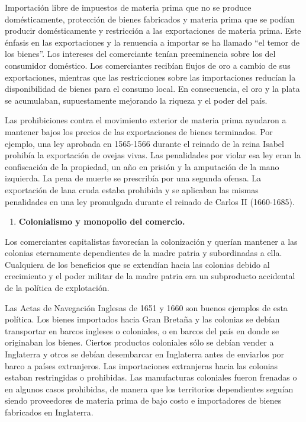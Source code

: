 \documentclass[
  stu,
  floatsintext,
  longtable,
  a4paper,
  nolmodern,
  notxfonts,
  notimes,
  12pt,
  colorlinks=true,linkcolor=blue,citecolor=blue,urlcolor=blue]{apa7}
\providecommand{\tightlist}{%
  \setlength{\itemsep}{0pt}\setlength{\parskip}{0pt}}
\begin{document}
Importación libre de impuestos de materia prima que no se produce
domésticamente, protección de bienes fabricados y materia prima que se
podían producir domésticamente y restricción a las exportaciones de
materia prima. Este énfasis en las exportaciones y la renuencia a
importar se ha llamado ``el temor de los bienes''. Los intereses del
comerciante tenían preeminencia sobre los del consumidor doméstico. Los
comerciantes recibían flujos de oro a cambio de sus exportaciones,
mientras que las restricciones sobre las importaciones reducían la
disponibilidad de bienes para el consumo local. En consecuencia, el oro
y la plata se acumulaban, supuestamente mejorando la riqueza y el poder
del país.

Las prohibiciones contra el movimiento exterior de materia prima
ayudaron a mantener bajos los precios de las exportaciones de bienes
terminados. Por ejemplo, una ley aprobada en 1565-1566 durante el
reinado de la reina Isabel prohibía la exportación de ovejas vivas. Las
penalidades por violar esa ley eran la confiscación de la propiedad, un
año en prisión y la amputación de la mano izquierda. La pena de muerte
se prescribía por una segunda ofensa. La exportación de lana cruda
estaba prohibida y se aplicaban las mismas penalidades en una ley
promulgada durante el reinado de Carlos II (1660-1685).

\begin{enumerate}
\def\labelenumi{\arabic{enumi}.}
\tightlist
\item
  \hspace{0pt} \textbf{Colonialismo y monopolio del comercio.}
\end{enumerate}

Los comerciantes capitalistas favorecían la colonización y querían
mantener a las colonias eternamente dependientes de la madre patria y
subordinadas a ella. Cualquiera de los beneficios que se extendían hacia
las colonias debido al crecimiento y el poder militar de la madre patria
era un subproducto accidental de la política de explotación.

Las Actas de Navegación Inglesas de 1651 y 1660 son buenos ejemplos de
esta política. Los bienes importados hacia Gran Bretaña y las colonias
se debían transportar en barcos ingleses o coloniales, o en barcos del
país en donde se originaban los bienes. Ciertos productos coloniales
sólo se debían vender a Inglaterra y otros se debían desembarcar en
Inglaterra antes de enviarlos por barco a países extranjeros. Las
importaciones extranjeras hacia las colonias estaban restringidas o
prohibidas. Las manufacturas coloniales fueron frenadas o en algunos
casos prohibidas, de manera que los territorios dependientes seguían
siendo proveedores de materia prima de bajo costo e importadores de
bienes fabricados en Inglaterra.
\end{document}
